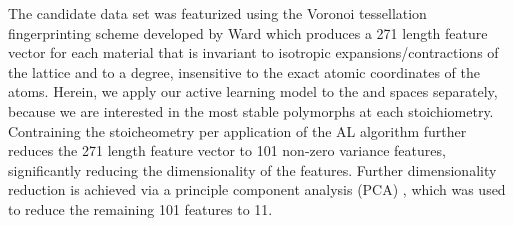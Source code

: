 %
%
The candidate data set was featurized using the Voronoi tessellation fingerprinting scheme developed by Ward  \cite{Ward2017} which produces a 271 length feature vector for each material that is invariant to isotropic expansions/contractions of the lattice and to a degree, insensitive to the exact atomic coordinates of the atoms.
%
Herein, we apply our active learning model to the \IrOtwo and \IrOthree spaces separately, because we are interested in the most stable polymorphs at each stoichiometry.
%
Contraining the stoicheometry per application of the AL algorithm further reduces the 271 length  feature vector to 101 non-zero variance features,
significantly reducing the dimensionality of the features.
%
Further dimensionality reduction is achieved via a principle component analysis (PCA) \cite{Tipping1999}, which was used to reduce the remaining 101 features to 11.


